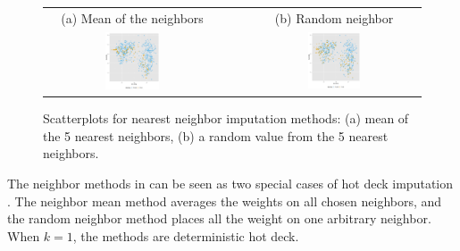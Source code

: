 \documentclass[article]{jss}
\begin{document}
\begin{center}
\begin{figure}[h]
\begin{centering}
\begin{tabular}{cccc}
{\tiny{(a) Mean of the neighbors}} &  &  & {\tiny{(b) Random neighbor}}\tabularnewline
\includegraphics[width=0.32\textwidth]{graph/fig3-5-knn} &  &  & \includegraphics[width=0.32\textwidth]{graph/fig3-5-knn-2}\tabularnewline
\end{tabular}
\par\end{centering}
\caption{Scatterplots for nearest neighbor imputation methods: (a) mean of the 5 nearest neighbors, (b) a random value from the 5 nearest neighbors.}
\label{fig:neighbor-imputation}
\end{figure}
\par\end{center}


The neighbor methods in  can be seen as two
special cases of hot deck imputation \citep{andridge2010review}.
The neighbor mean method averages the weights on all chosen neighbors,
and the random neighbor method places all the weight on one arbitrary
neighbor. When $k=1$, the methods are deterministic hot deck.
\end{document}
